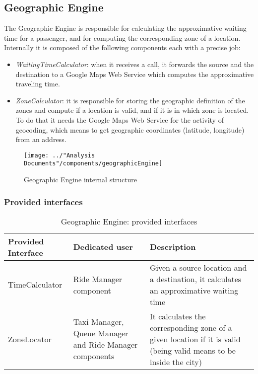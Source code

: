 \subsection{Geographic Engine}\label{comp:geographicEngine}
The Geographic Engine is responsible for calculating the approximative waiting time for a passenger, and for computing the corresponding zone of a location. Internally it is composed of the following components each with a precise job:
\begin{itemize}
	\item \textit{WaitingTimeCalculator}: when it receives a call, it forwards the source and the destination to a Google Maps Web Service which computes the approximative traveling time.
	\item \textit{ZoneCalculator}: it is responsible for storing the geographic definition of the zones and compute if a location is valid, and if it is in which zone is located. To do that it needs the Google Maps Web Service for the activity of geocoding, which means to get geographic coordinates (latitude, longitude) from an address.
\end{itemize}
\begin{figure}[H]
	\centering
	\texttt{[image: ../"Analysis Documents"/components/geographicEngine]}
	\label{fig:geographicengine}
	\caption{Geographic Engine internal structure}
\end{figure}
\subsubsection{Provided interfaces}
\begin{table}[H]
	\begin{longtable}{| p{} | p{} | p{} |}
		\hline
		\textbf{Provided Interface} & \textbf{Dedicated user} & \textbf{Description} \\ \hline
		TimeCalculator & Ride Manager component & Given a source location and a destination, it calculates an approximative waiting time \\ \hline
		ZoneLocator & Taxi Manager, Queue Manager and Ride Manager components & It calculates the corresponding zone of a given location if it is valid (being valid means to be inside the city) \\ \hline
	\end{longtable}
	\caption{Geographic Engine: provided interfaces}
	\label{tab:geographicengine:providedInterfaces}
\end{table}
